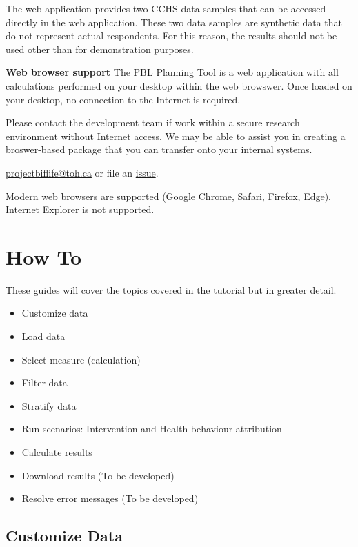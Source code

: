 \documentclass[]{book}
\providecommand{\tightlist}{%
  \setlength{\itemsep}{0pt}\setlength{\parskip}{0pt}}
\begin{document}
The web application provides two CCHS data samples that can be accessed directly in the web application. These two data samples are synthetic data that do not represent actual respondents. For this reason, the results should not be used other than for demonstration purposes.

\textbf{Web browser support}
The PBL Planning Tool is a web application with all calculations performed on your desktop within the web browswer. Once loaded on your desktop, no connection to the Internet is required.

Please contact the development team if work within a secure research environment without Internet access. We may be able to assist you in creating a broswer-based package that you can transfer onto your internal systems.

\href{mailto:projectbiglife.ca}{projectbiflife@toh.ca} or file an \href{https://github.com/Big-Life-Lab/PBL-Planning-Tool-Guidance/issues}{issue}.

Modern web browsers are supported (Google Chrome, Safari, Firefox, Edge). Internet Explorer is not supported.

\hypertarget{howto}{%
\chapter{How To}\label{howto}}

These guides will cover the topics covered in the tutorial but in greater detail.

\begin{itemize}
\tightlist
\item
  Customize data
\item
  Load data
\item
  Select measure (calculation)
\item
  Filter data
\item
  Stratify data
\item
  Run scenarios: Intervention and Health behaviour attribution
\item
  Calculate results
\item
  Download results (To be developed)
\item
  Resolve error messages (To be developed)
\end{itemize}

\hypertarget{customize-data}{%
\section{Customize Data}\label{customize-data}}
\end{document}
